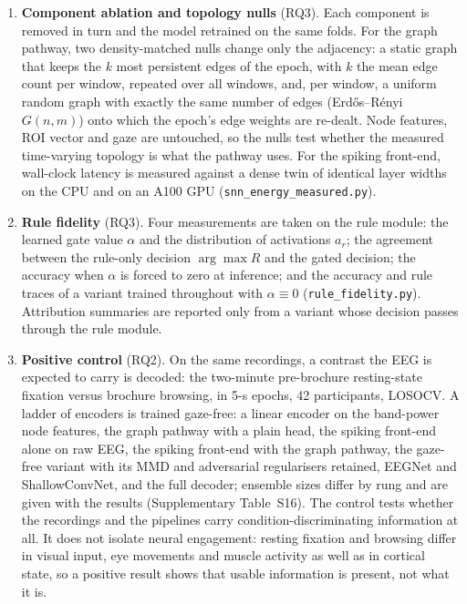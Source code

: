 \begin{enumerate}
\item \textbf{Component ablation and topology nulls} (RQ3). Each component is removed in turn and the model retrained on the same folds. For the graph pathway, two density-matched nulls change only the adjacency: a static graph that keeps the $k$ most persistent edges of the epoch, with $k$ the mean edge count per window, repeated over all windows, and, per window, a uniform random graph with exactly the same number of edges (Erd\H{o}s--R\'enyi $G(n,m)$) onto which the epoch's edge weights are re-dealt. Node features, ROI vector and gaze are untouched, so the nulls test whether the measured time-varying topology is what the pathway uses. For the spiking front-end, wall-clock latency is measured against a dense twin of identical layer widths on the CPU and on an A100 GPU (\texttt{snn\_energy\_measured.py}).
\item \textbf{Rule fidelity} (RQ3). Four measurements are taken on the rule module: the learned gate value $\alpha$ and the distribution of activations $a_r$; the agreement between the rule-only decision $\arg\max R$ and the gated decision; the accuracy when $\alpha$ is forced to zero at inference; and the accuracy and rule traces of a variant trained throughout with $\alpha\equiv0$ (\texttt{rule\_fidelity.py}). Attribution summaries are reported only from a variant whose decision passes through the rule module.
\item \textbf{Positive control} (RQ2). On the same recordings, a contrast the EEG is expected to carry is decoded: the two-minute pre-brochure resting-state fixation versus brochure browsing, in 5-s epochs, 42 participants, LOSOCV. A ladder of encoders is trained gaze-free: a linear encoder on the band-power node features, the graph pathway with a plain head, the spiking front-end alone on raw EEG, the spiking front-end with the graph pathway, the gaze-free variant with its MMD and adversarial regularisers retained, EEGNet and ShallowConvNet, and the full decoder; ensemble sizes differ by rung and are given with the results (Supplementary Table~S16). The control tests whether the recordings and the pipelines carry condition-discriminating information at all. It does not isolate neural engagement: resting fixation and browsing differ in visual input, eye movements and muscle activity as well as in cortical state, so a positive result shows that usable information is present, not what it is.

\end{enumerate}
